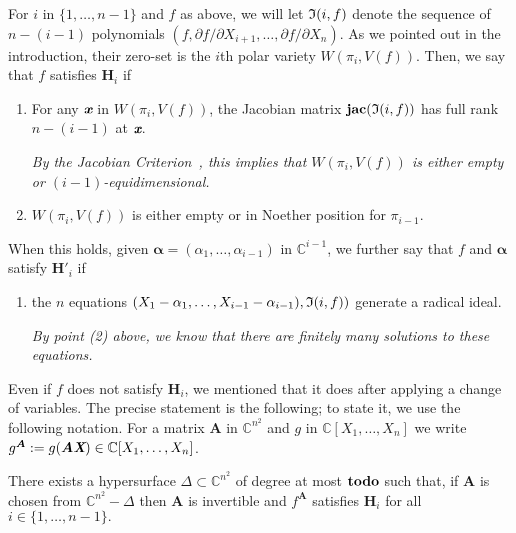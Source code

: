\documentclass[sigconf]{acmart}
\def\td{{\bf todo}}
\def\Xb{\textit{\textbf{X}}}
\def\mA{{\bm A}}
\def\xb{\textit{\textbf{x}}}
\def\C{\mathbb{C}}
\def\jac{ \textbf{jac}}
\def\pa{\partial}
\def\D{\Delta}
\def\I{\frak{I}}
\begin{document}
For $i$ in $\{1,\dots,n-1\}$ and $f$ as above, we will let $\I(i, f)$
denote the sequence of $n-(i-1)$ polynomials $(f, {\pa f}/{\pa
  X_{i+1}},\dots,{\pa f}/{\pa X_n})$. As we pointed out in the
introduction, their zero-set is the $i$th polar variety $W(\pi_i,V(f))$.
Then, we say that $f$ satisfies $\textbf{H}_i$ if
\begin{enumerate}
\item For any $\xb$ in $W(\pi_i,V(f))$, the Jacobian matrix
  $\jac(\I(i, f))$ has full rank $n-(i-1)$ at $\xb$.

  {\em By the Jacobian Criterion~\cite[Corollary 16.20]{ECA}, this
  implies that $W(\pi_i,V(f))$ is either empty or $(i-1)$-equidimensional.}

\smallskip

\item $W(\pi_i,V(f))$ is either empty or in Noether position for
  $\pi_{i-1}$.
\end{enumerate}
When this holds, given $\bm \alpha = (\alpha_1,\hdots,\alpha_{i-1})$
in $\C^{i-1}$, we further say that $f$ and $\bm \alpha$ satisfy
$\textbf{H}'_i$ if
\begin{enumerate}
\item the $n$ equations
  $(X_1-\alpha_1,\dots,X_{i-1}-\alpha_{i-1}),\I(i, f))$ generate a
  radical ideal.

  {\em By point (2) above, we know that there are finitely many solutions 
    to these equations.}
\end{enumerate}

Even if $f$ does not satisfy $\textbf{H}_i$, we mentioned that it does
after applying a change of variables. The precise statement is the
following; to state it, we use the following notation. For a matrix
$\mA$ in $\C^{n^2}$ and $g$ in $\C[X_1,\hdots,X_n]$ we write
$g^\mA:=g(\mA \Xb) \in \C[X_1,\dots,X_n]$.


\begin{theorem}
  There exists a hypersurface $\D \subset \mathbb{C}^{n^2}$ of degree
  at most $\td$ such that, if $\mA$ is chosen from $\C^{n^2}-\Delta$
  then $\mA$ is invertible and $f^\mA$ satisfies $\textbf{H}_i$ for
  all $i \in \{1,\hdots,n-1\}.$
\end{theorem}
\end{document}
